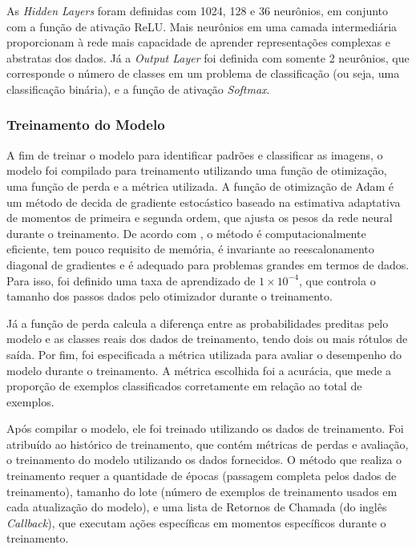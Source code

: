As \textit{Hidden Layers} foram definidas com 1024, 128 e 36 neurônios, em conjunto com a função de ativação ReLU. Mais neurônios em uma camada intermediária proporcionam à rede mais capacidade de aprender representações complexas e abstratas dos dados. Já a \textit{Output Layer} foi definida com somente 2 neurônios, que corresponde o número de classes em um problema de classificação (ou seja, uma classificação binária), e a função de ativação \textit{Softmax}.


\subsubsection{\esp Treinamento do Modelo} \label{treinamento}

A fim de treinar o modelo para identificar padrões e classificar as imagens, o modelo foi compilado para treinamento utilizando uma função de otimização, uma função de perda e a métrica utilizada. A função de otimização de Adam é um método de decida de gradiente estocástico baseado na estimativa adaptativa de momentos de primeira e segunda ordem, que ajusta os pesos da rede neural durante o treinamento. De acordo com , o método é computacionalmente eficiente, tem pouco requisito de memória, é invariante ao reescalonamento diagonal de gradientes e é adequado para problemas grandes em termos de dados. Para isso, foi definido uma taxa de aprendizado de \ensuremath{1 \times 10^{-4}}, que controla o tamanho dos passos dados pelo otimizador durante o treinamento. 

Já a função de perda calcula a diferença entre as probabilidades preditas pelo modelo e as classes reais dos dados de treinamento, tendo dois ou mais rótulos de saída. Por fim, foi especificada a métrica utilizada para avaliar o desempenho do modelo durante o treinamento. A métrica escolhida foi a acurácia, que mede a proporção de exemplos classificados corretamente em relação ao total de exemplos. 

Após compilar o modelo, ele foi treinado utilizando os dados de treinamento. Foi atribuído ao histórico de treinamento, que contém métricas de perdas e avaliação, o treinamento do modelo utilizando os dados fornecidos. O método que realiza o treinamento requer a quantidade de épocas (passagem completa pelos dados de treinamento), tamanho do lote (número de exemplos de treinamento usados em cada atualização do modelo), e uma lista de Retornos de Chamada (do inglês \textit{Callback}), que executam ações específicas em momentos específicos durante o treinamento. 

